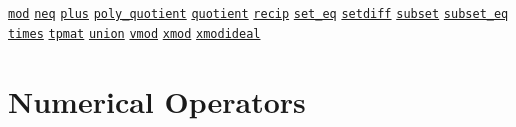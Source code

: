 \begin{list}{}
\hyperlink{operator:MOD}{\texttt{mod}}
\hyperlink{operator:NEQ}{\texttt{neq}}
\hyperlink{operator:PLUS}{\texttt{plus}}
\hyperlink{operator:POLY_QUOTIENT}{\texttt{poly\_quotient}}
\hyperlink{operator:QUOTIENT}{\texttt{quotient}}
\hyperlink{operator:RECIP}{\texttt{recip}}
\hyperlink{operator:SET_EQ}{\texttt{set\_eq}}
\hyperlink{operator:SETDIFF}{\texttt{setdiff}}
\hyperlink{operator:SUBSET}{\texttt{subset}}
\hyperlink{operator:SUBSET_EQ}{\texttt{subset\_eq}}
\hyperlink{operator:TIMES}{\texttt{times}}
\hyperlink{operator:TPMAT}{\texttt{tpmat}}
\hyperlink{operator:SETS_UNION}{\texttt{union}}
\hyperlink{operator:VMOD}{\texttt{vmod}}
\hyperlink{operator:XMOD}{\texttt{xmod}}
\hyperlink{operator:XMODIDEAL}{\texttt{xmodideal}}
\halfinterwordspace

\section{Numerical Operators}


\end{list}
